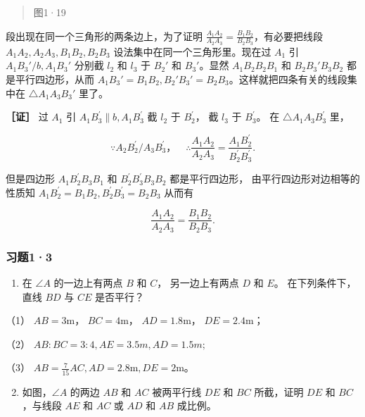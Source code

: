 \begin{quote}
图1·19
\end{quote}

段出现在同一个三角形的两条边上，为了证明
\(\frac{A_1A_2}{A_2A_3} = \frac{B_1B_2}{B_2B_3}\)，有必要把线段
\(A_1A_2, A_2A_3, B_1B_2, B_2B_3\) 设法集中在同一个三角形里。现在过
\(A_1\) 引 \(A_1B_3' / b, A_1B_3'\) 分别截 \(l_2\) 和 \(l_3\) 于
\(B_2'\) 和 \(B_3'\)。显然 \(A_1B_2B_2B_1\) 和 \(B_2B_3'B_3B_2\)
都是平行四边形，从而
\(A_1B_3' = B_1B_2, B_2'B_3' = B_2B_3\)。这样就把四条有关的线段集中在
\(\triangle A_1A_3B_3'\) 里了。

\textbf{［证］} 过 \(A_{1}\) 引
\(A_{1}B_{3}^{\prime} \parallel b, A_{1}B_{3}^{\prime}\) 截 \(l_{2}\) 于
\(B_{2}^{\prime}\)， 截 \(l_{3}\) 于 \(B_{3}^{\prime}\)。 在
\(\triangle A_{1}A_{3}B_{3}^{\prime}\) 里，

\[
\because A _ {2} B _ {2} ^ {\prime} / A _ {3} B _ {3} ^ {\prime}\text{，} \quad \therefore \frac {A _ {1} A _ {2}}{A _ {2} A _ {3}} = \frac {A _ {1} B _ {2} ^ {\prime}}{B _ {2} ^ {\prime} B _ {3} ^ {\prime}}.
\]

但是四边形 \(A_{1}B_{2}^{\prime}B_{3}B_{1}\) 和
\(B_{2}^{\prime}B_{3}^{\prime}B_{3}B_{2}\) 都是平行四边形，
由平行四边形对边相等的性质知
\(A_{1}B_{2}^{\prime} = B_{1}B_{2}, B_{2}^{\prime}B_{3}^{\prime} = B_{2}B_{3}\)
从而有

\[
\frac {A _ {1} A _ {2}}{A _ {2} A _ {3}} = \frac {B _ {1} B _ {2}}{B _ {2} B _ {3}}.
\]

\subsubsection{习题1·3}

\begin{enumerate}
\item
  在 \(\angle A\) 的一边上有两点 \(B\) 和 \(C\)， 另一边上有两点 \(D\)
  和 \(E\)。 在下列条件下， 直线 \(BD\) 与 \(CE\) 是否平行？
\end{enumerate}

（1） \(AB = 3\mathrm{m}\)， \(BC = 4\mathrm{m}\)，
\(AD = 1.8\mathrm{m}\)， \(DE = 2.4\mathrm{m}\)；

（2） \(AB:BC = 3:4, AE = 3.5m, AD = 1.5m;\)

（3） \(AB = \frac{7}{15} AC, AD = 2.8\mathrm{m}, DE = 2\mathrm{m}\)。

\begin{enumerate}
\setcounter{enumi}{1}
\item
  如图，\(\angle A\) 的两边 \(AB\) 和 \(AC\) 被两平行线 \(DE\) 和 \(BC\)
  所截，证明 \(DE\) 和 \(BC\)，与线段 \(AE\) 和 \(AC\) 或 \(AD\) 和
  \(AB\) 成比例。
\end{enumerate}


